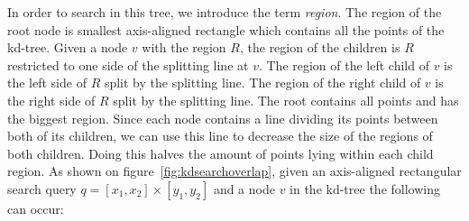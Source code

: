 %
%
%
%
%
%
In order to search in this tree, we introduce the term \emph{region}. The region of the root node is smallest axis-aligned rectangle which contains all the points of the kd-tree. Given a node $v$ with the region $R$, the region of the children is $R$ restricted to one side of the splitting line at $v$. The region of the left child of $v$ is the left side of $R$ split by the splitting line. The region of the right child of $v$ is the right side of $R$ split by the splitting line. The root contains all points and has the biggest region. Since each node contains a line dividing its points between both of its children, we can use this line to decrease the size of the regions of both children. Doing this halves the amount of points lying within each child region. As shown on figure~\ref{fig:kdsearchoverlap}, given an axis-aligned rectangular search query $q = [x_1, x_2] \times [y_1, y_2]$ and a node $v$ in the kd-tree the following can occur:

